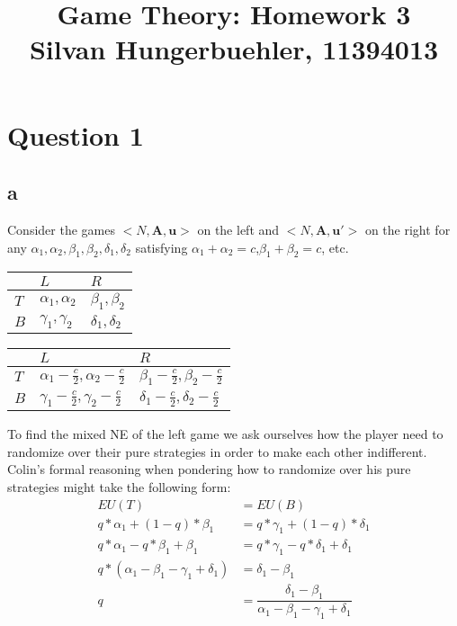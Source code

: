 \documentclass[10pt,a4paper]{article}
\title{%
  Game Theory: Homework 3 \\
  \large Silvan Hungerbuehler, 11394013}
\date{}
\begin{document}
\maketitle

\section*{Question 1}
\subsection*{a}
Consider the games $<N,\boldsymbol{A},\boldsymbol{u}>$ on the left and $<N,\boldsymbol{A},\boldsymbol{u'}>$ on the right for any $\alpha_1,\alpha_2,\beta_1,\beta_2,\delta_1,\delta_2$ satisfying $\alpha_1+\alpha_2=c$,$\beta_1+\beta_2=c$, etc.
\begin{table}[h]
\centering
\begin{tabular}[l]{|l|l|l|}
\hline
          & $L$ & $R$  \\ \hline
$T$     & $\alpha_1,\alpha_2$   & $\beta_1,\beta_2$ \\ \hline
$B$		& $\gamma_1,\gamma_2$	& $\delta_1,\delta_2$ \\ \hline
\end{tabular}
\quad
\begin{tabular}[r]{|l|l|l|}
\hline
          & $L$ & $R$  \\ \hline
$T$     & $\alpha_1-\tfrac{c}{2},\alpha_2-\tfrac{c}{2}$   & $\beta_1-\tfrac{c}{2},\beta_2-\tfrac{c}{2}$ \\ \hline
$B$		& $\gamma_1-\tfrac{c}{2},\gamma_2-\tfrac{c}{2}$	& $\delta_1-\tfrac{c}{2},\delta_2-\tfrac{c}{2}$ \\ \hline
\end{tabular}
\end{table}
To find the mixed NE of the left game we ask ourselves how the player need to randomize over their pure strategies in order to make each other indifferent. Colin's formal reasoning when pondering how to randomize over his pure strategies might take the following form:\\
\begin{align*}
EU(T)&=EU(B) \\
q*\alpha_1+(1-q)*\beta_1&=q*\gamma_1+(1-q)*\delta_1 \\
q*\alpha_1-q*\beta_1+\beta_1&=q*\gamma_1-q*\delta_1+\delta_1 \\
q*(\alpha_1-\beta_1-\gamma_1+\delta_1)&=\delta_1-\beta_1 \\
q &= \dfrac{\delta_1-\beta_1}{\alpha_1-\beta_1-\gamma_1+\delta_1}
\end{align*}
\end{document}
